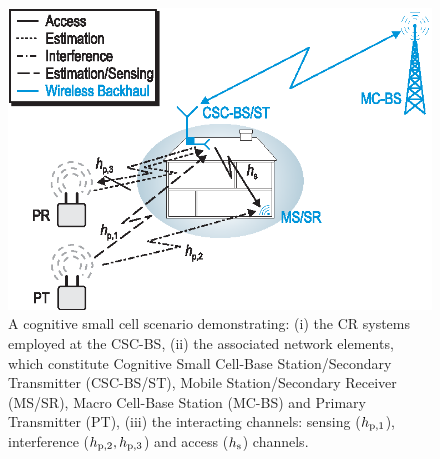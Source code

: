 \begin{figure}[!t]
\centering
\includegraphics[width = \figscalet]{figures/CR_Scenario_Hybrid}
\caption{A cognitive small cell scenario demonstrating: (i) the CR systems employed at the CSC-BS, (ii) the associated network elements, which constitute Cognitive Small Cell-Base Station/Secondary Transmitter (CSC-BS/ST), Mobile Station/Secondary Receiver (MS/SR), Macro Cell-Base Station (MC-BS) and Primary Transmitter (PT), (iii) the interacting channels: sensing ($h_{\text{p,1}}$), interference ($h_{\text{p,2}}, h_{\text{p,3}}$) and access ($h_{\text{s}}$) channels.}
\label{fig:scenario}
\end{figure}


